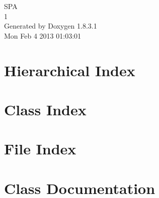 \documentclass{book}
\begin{document}
\hypersetup{pageanchor=false,citecolor=blue}
\begin{titlepage}
\vspace*{7cm}
\begin{center}
{\Large S\-P\-A \\[1ex]\large 1 }\\
\vspace*{1cm}
{\large Generated by Doxygen 1.8.3.1}\\
\vspace*{0.5cm}
{\small Mon Feb 4 2013 01:03:01}\\
\end{center}
\end{titlepage}
\clearemptydoublepage
{}
\tableofcontents
\clearemptydoublepage
{}
\hypersetup{pageanchor=true,citecolor=blue}
\chapter{Hierarchical Index}

\chapter{Class Index}

\chapter{File Index}

\chapter{Class Documentation}


























\end{document}
